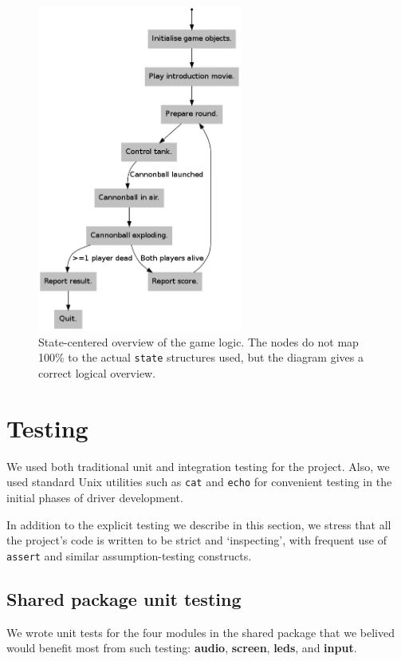 \documentclass[a4paper,10pt]{article}
\newcommand{\isrc}[1]{\texttt{#1}}
\begin{document}
\begin{figure}[!h]
    \centering
    \includegraphics[width=0.6\textwidth]{scorched-main-logic.dot.png}
    \caption{State-centered overview of the game logic. The nodes do not map
    100\% to the actual \isrc{state} structures used, but the diagram gives a
    correct logical overview.}
    \label{fig:mainstates}
\end{figure}


\clearpage

\section{Testing}
\label{sec:testing}
We used both traditional unit and integration testing for the project. Also,
we used standard Unix utilities such as \isrc{cat} and \isrc{echo}
for convenient testing in the initial phases of driver development.

In addition to the explicit testing we describe in this section, we stress
that all the project's code is written to be strict and `inspecting', with
frequent use of \isrc{assert} and similar assumption-testing constructs.

\subsection{Shared package unit testing}
We wrote unit tests for the four modules in the \textsf{shared} package that
we belived would benefit most from such testing: \textbf{audio},
\textbf{screen}, \textbf{leds}, and \textbf{input}. 
\end{document}
